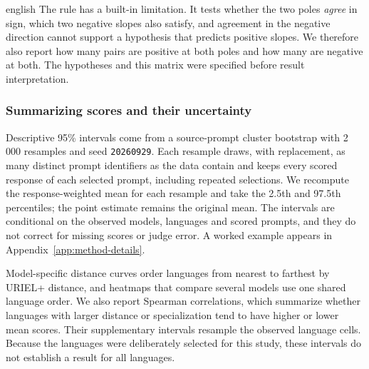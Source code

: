 \begin{otherlanguage*}{english}
The rule has a built-in limitation. It tests whether the two poles \emph{agree} in sign, which two negative slopes also satisfy, and agreement in the negative direction cannot support a hypothesis that predicts positive slopes. We therefore also report how many pairs are positive at both poles and how many are negative at both. The hypotheses and this matrix were specified before result interpretation.

\subsubsection{Summarizing scores and their uncertainty}

Descriptive 95\% intervals come from a source-prompt cluster bootstrap with 2\,000 resamples and seed \texttt{20260929}. Each resample draws, with replacement, as many distinct prompt identifiers as the data contain and keeps every scored response of each selected prompt, including repeated selections. We recompute the response-weighted mean for each resample and take the 2.5th and 97.5th percentiles; the point estimate remains the original mean. The intervals are conditional on the observed models, languages and scored prompts, and they do not correct for missing scores or judge error. A worked example appears in Appendix~\ref{app:method-details}.

Model-specific distance curves order languages from nearest to farthest by URIEL+ distance, and heatmaps that compare several models use one shared language order. We also report Spearman correlations, which summarize whether languages with larger distance or specialization tend to have higher or lower mean scores. Their supplementary intervals resample the observed language cells. Because the languages were deliberately selected for this study, these intervals do not establish a result for all languages.


\end{otherlanguage*}
